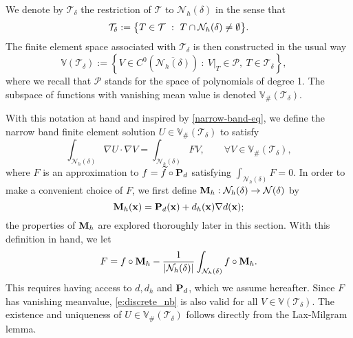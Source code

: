 We denote by  $\mathcal T_\delta$ the restriction of $\mathcal T$ to $\mathcal N_h(\delta)$  in the sense that
$$
\mathcal T_\delta := \big\lbrace T\in\mathcal{T}  \ : \ T\cap \mathcal N_h(\delta) \not = \emptyset \big\rbrace.
$$
The finite element space associated with $\mathcal T_\delta$ is then constructed in the usual way
$$
\mathbb V(\mathcal T_\delta) := \left\lbrace V \in C^0(\overline{\mathcal N_h(\delta)}) \ : \ V|_T \in \mathcal P, \ T \in \mathcal T_\delta \right\rbrace, \quad
$$
where we recall that $\mathcal P$ stands for the space of polynomials of degree 1.
The subspace of functions with vanishing mean value is denoted $\mathbb V_{\#}(\mathcal T_\delta)$.

With this notation at hand and inspired by \eqref{narrow-band-eq},  we define the narrow band finite element solution $U \in \mathbb V_{\#}(\mathcal T_\delta)$ to satisfy
%
\begin{equation}\label{e:discrete_nb}
\int_{\mathcal N_h(\delta)} \nabla U \cdot \nabla V = \int_{\mathcal N_h(\delta)}F  V, \qquad \forall V \in \mathbb V_\#(\mathcal T_\delta),
\end{equation}
where $F$ is an approximation to $f=\widetilde f \circ {\bf P}_d$ satisfying $\int_{\mathcal N_h(\delta)} F = 0$. In order to make a convenient choice of $F$, we first define ${\bf M}_h:\mathcal{N}_h(\delta) \rightarrow \mathcal{N}(\delta)$ by
%
\[
  {\bf M}_h({\bf x})={\bf P}_d({\bf x}) + d_h({\bf x}) \nabla d({\bf x});
\]
%
the properties of ${\bf M}_h$ are explored thoroughly later in this section.  With this definition in hand, we let
%
\begin{equation}\label{e:narrow:F}
F = f \circ {\bf M}_h-  \frac{1}{  |\mathcal N_h(\delta)|}  \int_{\mathcal N_h(\delta)} f \circ {\bf M}_h.
\end{equation}
%
%
This requires having access to $d, d_h$ and ${\bf P}_d$, which we assume hereafter.
Since $F$ has vanishing meanvalue, \eqref{e:discrete_nb} is also valid for all
$V\in \mathbb V(\mathcal T_\delta)$.
The existence and uniqueness of $U \in \mathbb V_\#(\mathcal T_\delta)$ follows directly from the Lax-Milgram lemma. 

